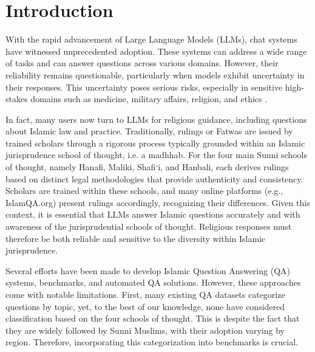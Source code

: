 \documentclass[letterpaper]{article}
\begin{document}
%

\section{Introduction}
With the rapid advancement of Large Language Models (LLMs), chat systems have witnessed unprecedented adoption. These systems can address a wide range of tasks and can answer questions across various domains. However, their reliability remains questionable, particularly when models exhibit uncertainty in their responses. This uncertainty poses serious risks, especially in sensitive high-stakes domains such as medicine, military affairs, religion, and ethics \cite{madhusudhan2024llms,lin2021truthfulqa}.

In fact, many users now turn to LLMs for religious guidance, including questions about Islamic law and practice. Traditionally, rulings or Fatwas are issued by trained scholars through a rigorous process typically grounded within an Islamic jurisprudence school of thought, i.e. a madhhab. For the four main Sunni schools of thought, namely Hanafi, Maliki, Shafi‘i, and Hanbali, each derives rulings based on distinct legal methodologies that provide authenticity and consistency. Scholars are trained within these schools, and many online platforms (e.g., IslamQA.org) present rulings accordingly, recognizing their differences. Given this context, it is essential that LLMs answer Islamic questions accurately and with awareness of the jurisprudential schools of thought. Religious responses must therefore be both reliable and sensitive to the diversity within Islamic jurisprudence.

Several efforts have been made to develop Islamic Question Answering (QA) systems, benchmarks, and automated QA solutions. However, these approaches come with notable limitations. First, many existing QA datasets categorize questions by topic, yet, to the best of our knowledge, none have considered classification based on the four schools of thought.  This is despite the fact that they are widely followed by Sunni Muslims, with their adoption varying by region. Therefore, incorporating this categorization into benchmarks is crucial.
\end{document}
